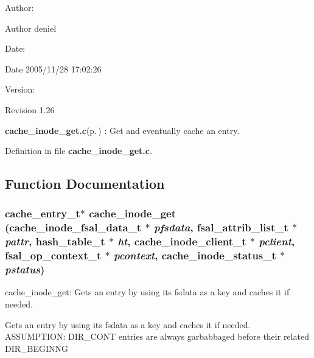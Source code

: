 \begin{Desc}
\item[Author:]\begin{Desc}
\item[Author]deniel \end{Desc}
\end{Desc}
\begin{Desc}
\item[Date:]\begin{Desc}
\item[Date]2005/11/28 17:02:26 \end{Desc}
\end{Desc}
\begin{Desc}
\item[Version:]\begin{Desc}
\item[Revision]1.26 \end{Desc}
\end{Desc}
{\bf cache\_\-inode\_\-get.c}{\rm (p.\,\pageref{cache__inode__get_8c})} : Get and eventually cache an entry.

Definition in file {\bf cache\_\-inode\_\-get.c}.

\subsection{Function Documentation}
\subsubsection{\setlength{\rightskip}{0pt plus 5cm}cache\_\-entry\_\-t$\ast$ cache\_\-inode\_\-get (cache\_\-inode\_\-fsal\_\-data\_\-t $\ast$ {\em pfsdata}, fsal\_\-attrib\_\-list\_\-t $\ast$ {\em pattr}, hash\_\-table\_\-t $\ast$ {\em ht}, cache\_\-inode\_\-client\_\-t $\ast$ {\em pclient}, fsal\_\-op\_\-context\_\-t $\ast$ {\em pcontext}, cache\_\-inode\_\-status\_\-t $\ast$ {\em pstatus})}\label{cache__inode__get_8c_a0}


cache\_\-inode\_\-get: Gets an entry by using its fsdata as a key and caches it if needed.

Gets an entry by using its fsdata as a key and caches it if needed. ASSUMPTION: DIR\_\-CONT entries are always garbabbaged before their related DIR\_\-BEGINNG

